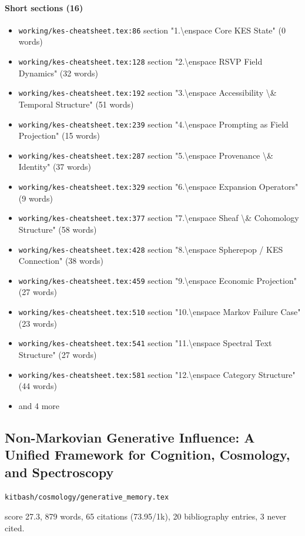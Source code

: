 \documentclass[11pt]{article}
\newcommand{\loc}[1]{{\small\color{muted}\texttt{#1}}}
\begin{document}
\paragraph{Short sections (16)}
\begin{itemize}
\item \loc{working/\allowbreak{}kes-cheatsheet.tex:86} section "1.\textbackslash{}enspace Core KES State" (0 words)
\item \loc{working/\allowbreak{}kes-cheatsheet.tex:128} section "2.\textbackslash{}enspace RSVP Field Dynamics" (32 words)
\item \loc{working/\allowbreak{}kes-cheatsheet.tex:192} section "3.\textbackslash{}enspace Accessibility \textbackslash{}\& Temporal Structure" (51 words)
\item \loc{working/\allowbreak{}kes-cheatsheet.tex:239} section "4.\textbackslash{}enspace Prompting as Field Projection" (15 words)
\item \loc{working/\allowbreak{}kes-cheatsheet.tex:287} section "5.\textbackslash{}enspace Provenance \textbackslash{}\& Identity" (37 words)
\item \loc{working/\allowbreak{}kes-cheatsheet.tex:329} section "6.\textbackslash{}enspace Expansion Operators" (9 words)
\item \loc{working/\allowbreak{}kes-cheatsheet.tex:377} section "7.\textbackslash{}enspace Sheaf \textbackslash{}\& Cohomology Structure" (58 words)
\item \loc{working/\allowbreak{}kes-cheatsheet.tex:428} section "8.\textbackslash{}enspace Spherepop / KES Connection" (38 words)
\item \loc{working/\allowbreak{}kes-cheatsheet.tex:459} section "9.\textbackslash{}enspace Economic Projection" (27 words)
\item \loc{working/\allowbreak{}kes-cheatsheet.tex:510} section "10.\textbackslash{}enspace Markov Failure Case" (23 words)
\item \loc{working/\allowbreak{}kes-cheatsheet.tex:541} section "11.\textbackslash{}enspace Spectral Text Structure" (27 words)
\item \loc{working/\allowbreak{}kes-cheatsheet.tex:581} section "12.\textbackslash{}enspace Category Structure" (44 words)
\item[] {\color{muted}\small and 4 more}
\end{itemize}
\subsection{Non-Markovian Generative Influence: A Unified Framework for Cognition, Cosmology, and Spectroscopy}
\loc{kitbash/\allowbreak{}cosmology/\allowbreak{}generative\_memory.tex}\par
score 27.3, 879 words, 65 citations (73.95/1k), 20 bibliography entries, 3 never cited.
\end{document}
